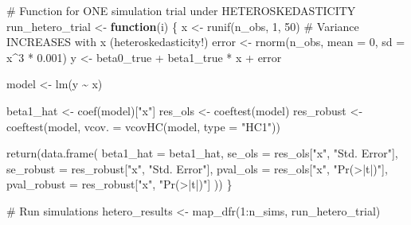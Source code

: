 \documentclass[
  letterpaper,
  DIV=11,
  numbers=noendperiod]{scrreprt}
\newenvironment{Shaded}{\begin{snugshade}}{\end{snugshade}}
\newcommand{\AttributeTok}[1]{\textcolor[rgb]{0.40,0.45,0.13}{#1}}
\newcommand{\CommentTok}[1]{\textcolor[rgb]{0.37,0.37,0.37}{#1}}
\newcommand{\ControlFlowTok}[1]{\textcolor[rgb]{0.00,0.23,0.31}{\textbf{#1}}}
\newcommand{\DecValTok}[1]{\textcolor[rgb]{0.68,0.00,0.00}{#1}}
\newcommand{\FloatTok}[1]{\textcolor[rgb]{0.68,0.00,0.00}{#1}}
\newcommand{\FunctionTok}[1]{\textcolor[rgb]{0.28,0.35,0.67}{#1}}
\newcommand{\NormalTok}[1]{\textcolor[rgb]{0.00,0.23,0.31}{#1}}
\newcommand{\OtherTok}[1]{\textcolor[rgb]{0.00,0.23,0.31}{#1}}
\newcommand{\SpecialCharTok}[1]{\textcolor[rgb]{0.37,0.37,0.37}{#1}}
\newcommand{\StringTok}[1]{\textcolor[rgb]{0.13,0.47,0.30}{#1}}
\begin{document}
\begin{Shaded}
\begin{Highlighting}[]
\CommentTok{\# Function for ONE simulation trial under HETEROSKEDASTICITY}
\NormalTok{run\_hetero\_trial }\OtherTok{\textless{}{-}} \ControlFlowTok{function}\NormalTok{(i) \{}
\NormalTok{    x }\OtherTok{\textless{}{-}} \FunctionTok{runif}\NormalTok{(n\_obs, }\DecValTok{1}\NormalTok{, }\DecValTok{50}\NormalTok{)}
    \CommentTok{\# Variance INCREASES with x (heteroskedasticity!)}
\NormalTok{    error }\OtherTok{\textless{}{-}} \FunctionTok{rnorm}\NormalTok{(n\_obs, }\AttributeTok{mean =} \DecValTok{0}\NormalTok{, }\AttributeTok{sd =}\NormalTok{ x}\SpecialCharTok{\^{}}\DecValTok{3} \SpecialCharTok{*} \FloatTok{0.001}\NormalTok{)}
\NormalTok{    y }\OtherTok{\textless{}{-}}\NormalTok{ beta0\_true }\SpecialCharTok{+}\NormalTok{ beta1\_true }\SpecialCharTok{*}\NormalTok{ x }\SpecialCharTok{+}\NormalTok{ error}

\NormalTok{    model }\OtherTok{\textless{}{-}} \FunctionTok{lm}\NormalTok{(y }\SpecialCharTok{\textasciitilde{}}\NormalTok{ x)}

\NormalTok{    beta1\_hat }\OtherTok{\textless{}{-}} \FunctionTok{coef}\NormalTok{(model)[}\StringTok{"x"}\NormalTok{]}
\NormalTok{    res\_ols }\OtherTok{\textless{}{-}} \FunctionTok{coeftest}\NormalTok{(model)}
\NormalTok{    res\_robust }\OtherTok{\textless{}{-}} \FunctionTok{coeftest}\NormalTok{(model, }\AttributeTok{vcov. =} \FunctionTok{vcovHC}\NormalTok{(model, }\AttributeTok{type =} \StringTok{"HC1"}\NormalTok{))}

    \FunctionTok{return}\NormalTok{(}\FunctionTok{data.frame}\NormalTok{(}
        \AttributeTok{beta1\_hat =}\NormalTok{ beta1\_hat,}
        \AttributeTok{se\_ols =}\NormalTok{ res\_ols[}\StringTok{"x"}\NormalTok{, }\StringTok{"Std. Error"}\NormalTok{],}
        \AttributeTok{se\_robust =}\NormalTok{ res\_robust[}\StringTok{"x"}\NormalTok{, }\StringTok{"Std. Error"}\NormalTok{],}
        \AttributeTok{pval\_ols =}\NormalTok{ res\_ols[}\StringTok{"x"}\NormalTok{, }\StringTok{"Pr(\textgreater{}|t|)"}\NormalTok{],}
        \AttributeTok{pval\_robust =}\NormalTok{ res\_robust[}\StringTok{"x"}\NormalTok{, }\StringTok{"Pr(\textgreater{}|t|)"}\NormalTok{]}
\NormalTok{    ))}
\NormalTok{\}}

\CommentTok{\# Run simulations}
\NormalTok{hetero\_results }\OtherTok{\textless{}{-}} \FunctionTok{map\_dfr}\NormalTok{(}\DecValTok{1}\SpecialCharTok{:}\NormalTok{n\_sims, run\_hetero\_trial)}


\end{Highlighting}
\end{Shaded}
\end{document}
